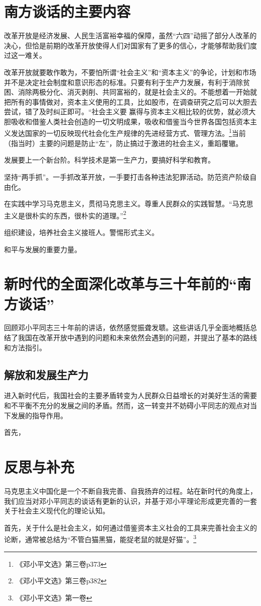 \documentclass[12pt]{article}
\begin{document}
\section{南方谈话的主要内容}
改革开放是经济发展、人民生活富裕幸福的保障，虽然“六四”动摇了部分人改革的决心，但恰是前期的改革开放使得人们对国家有了更多的信心，才能够帮助我们度过这一难关。

改革开放就要敢作敢为，不要怕所谓“社会主义”和“资本主义”的争论，计划和市场并不是决定社会制度和意识形态的标准。只要有利于生产力发展，有利于消除贫困、消除两极分化、消灭剥削、共同富裕的，就是社会主义的。不能想着一开始就把所有的事情做对，资本主义使用的工具，比如股市，在调查研究之后可以大胆去尝试，错了及时纠正即可。“社会主义要 赢得与资本主义相比较的优势，就必须大胆吸收和借鉴人类社会创造的一切文明成果，吸收和借鉴当今世界各国包括资本主义发达国家的一切反映现代社会化生产规律的先进经营方式、管理方法。\footnote{《邓小平文选》第三卷p373}当前（指当时）主要的问题是防止“左”，防止搞过于激进的社会主义，重蹈覆辙。

发展要上一个新台阶。科学技术是第一生产力，要搞好科学和教育。

坚持“两手抓”。一手抓改革开放，一手要打击各种违法犯罪活动。防范资产阶级自由化。

在实践中学习马克思主义，贯彻马克思主义。尊重人民群众的实践智慧。“马克思主义是很朴实的东西，很朴实的道理。”\footnote{《邓小平文选》第三卷p382}

组织建设，培养社会主义接班人。警惕形式主义。

和平与发展的重要力量。

\section{新时代的全面深化改革与三十年前的“南方谈话”}
回顾邓小平同志三十年前的讲话，依然感觉振聋发聩。这些讲话几乎全面地概括总结了我国在改革开放中遇到的问题和未来依然会遇到的问题，并提出了基本的路线和方法指引。

\subsection{解放和发展生产力}
进入新时代后，我国社会的主要矛盾转变为人民群众日益增长的对美好生活的需要和不平衡不充分的发展之间的矛盾。然而，这一转变并不妨碍小平同志的观点对当下发展的指导作用。

首先，

\section{反思与补充}
马克思主义中国化是一个不断自我完善、自我扬弃的过程。站在新时代的角度上，我们应当对邓小平同志的谈话有更新的认识，并基于邓小平理论形成更完善的一套关于社会主义现代化的理论认知。

首先，关于什么是社会主义，如何通过借鉴资本主义社会的工具来完善社会主义的论断，通常被总结为“不管白猫黑猫，能捉老鼠的就是好猫”。\footnote{《邓小平文选》第一卷}
\end{document}
